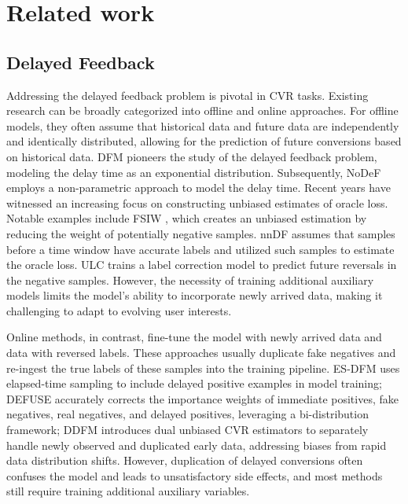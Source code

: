 \section{Related work}
\subsection{Delayed Feedback}
Addressing the delayed feedback problem is pivotal in CVR tasks.
Existing research can be broadly categorized into offline and online approaches.
For offline models, they often assume that historical data and future data are independently and identically distributed, allowing for the prediction of future conversions based on historical data. DFM \cite{chapelle2014modeling} pioneers the study of the delayed feedback problem, modeling the delay time as an exponential distribution.
Subsequently, NoDeF \cite{yoshikawa2018nonparametric} employs a non-parametric approach to model the delay time. Recent years have witnessed an increasing focus on constructing unbiased estimates of oracle loss.
Notable examples include FSIW \cite{yasui2020feedback}, which creates an unbiased estimation by reducing the weight of potentially negative samples. nnDF \cite{kato2020learning} assumes that samples before a time window have accurate labels and utilized such samples to estimate the oracle loss. ULC \cite{wang2023unbiased} trains a label correction model to predict future reversals in the negative samples.
However, the necessity of training additional auxiliary models limits the model's ability to incorporate newly arrived data, making it challenging to adapt to evolving user interests.

Online methods, in contrast, fine-tune the model with newly arrived data and data with reversed labels\cite{ktena2019addressing}. These approaches usually duplicate fake negatives and re-ingest the true labels of these samples into the training pipeline.
ES-DFM \cite{yang2021capturing} uses elapsed-time sampling to include delayed positive examples in model training;
DEFUSE \cite{chen2022asymptotically} accurately corrects the importance weights of immediate positives, fake negatives, real negatives, and delayed positives, leveraging a bi-distribution framework; DDFM\cite{dai2023dually} introduces dual unbiased CVR estimators to separately handle newly observed and duplicated early data, addressing biases from rapid data distribution shifts. However, duplication of delayed conversions often confuses the model and leads to unsatisfactory side effects, and most methods still require training additional auxiliary variables. 


